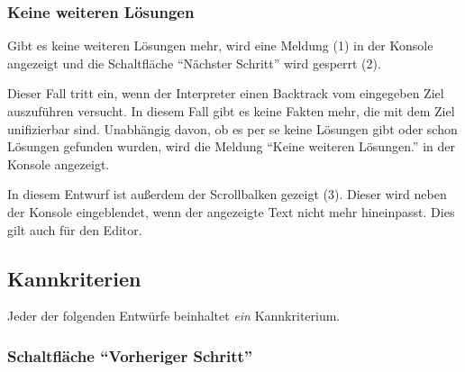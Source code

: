 \documentclass[parskip=full,11pt,twoside]{scrartcl}
\begin{document}
\subsubsection{Keine weiteren Lösungen}

\begin{minipage}{\linewidth}
\end{minipage}

Gibt es keine weiteren Lösungen mehr, wird eine Meldung (1) in der Konsole angezeigt und die Schaltfläche \enquote{Nächster Schritt} wird gesperrt (2).

Dieser Fall tritt ein, wenn der Interpreter einen Backtrack vom eingegeben Ziel auszuführen versucht.
In diesem Fall gibt es keine Fakten mehr, die mit dem Ziel unifizierbar sind.
Unabhängig davon, ob es per se keine Lösungen gibt oder schon Lösungen gefunden wurden, wird die Meldung \enquote{Keine weiteren Lösungen.} in der Konsole angezeigt.

In diesem Entwurf ist außerdem der Scrollbalken gezeigt (3).
Dieser wird neben der Konsole eingeblendet, wenn der angezeigte Text nicht mehr hineinpasst.
Dies gilt auch für den Editor.

\subsection{Kannkriterien}

Jeder der folgenden Entwürfe beinhaltet \emph{ein} Kannkriterium.

\subsubsection{Schaltfläche \enquote{Vorheriger Schritt}}

\begin{minipage}{\linewidth}
\end{minipage}

\begin{minipage}{\linewidth}
\end{minipage}
\end{document}
